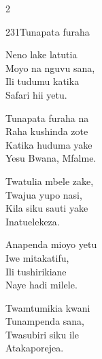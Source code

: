 \documentclass{article}
\begin{document}
\begin{multicols}{2}
\begin{hymn}{231}{Tunapata furaha}{}
\begin{stanza}
Neno lake latutia\\
Moyo na nguvu sana,\\
Ili tudumu katika\\
Safari hii yetu.
\end{stanza}
\begin{chorus}
Tunapata furaha na\\
Raha kushinda zote\\
Katika huduma yake\\
Yesu Bwana, Mfalme.
\end{chorus}
\begin{stanza}
Twatulia mbele zake,\\
Twajua yupo nasi,\\
Kila siku sauti yake\\
Inatuelekeza.
\end{stanza}
\begin{stanza}
Anapenda mioyo yetu\\
Iwe mitakatifu,\\
Ili tushirikiane\\
Naye hadi milele.
\end{stanza}
\begin{stanza}
Twamtumikia kwani\\
Tunampenda sana,\\
Twasubiri siku ile\\
Atakaporejea.
\end{stanza}
\end{hymn}


\end{multicols}
\end{document}
